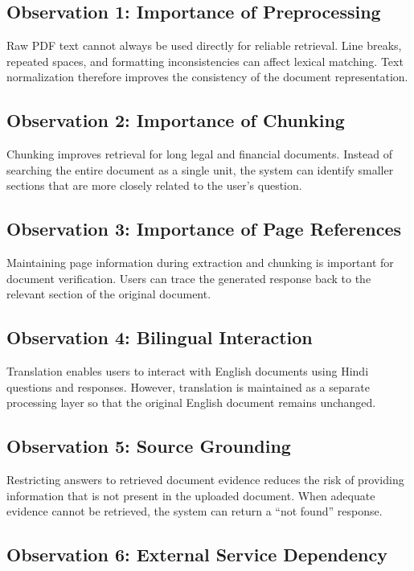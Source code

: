 \subsection{Observation 1: Importance of Preprocessing}

Raw PDF text cannot always be used directly for reliable retrieval.
Line breaks, repeated spaces, and formatting inconsistencies can
affect lexical matching. Text normalization therefore improves the
consistency of the document representation.

\subsection{Observation 2: Importance of Chunking}

Chunking improves retrieval for long legal and financial documents.
Instead of searching the entire document as a single unit, the system
can identify smaller sections that are more closely related to the
user's question.

\subsection{Observation 3: Importance of Page References}

Maintaining page information during extraction and chunking is
important for document verification. Users can trace the generated
response back to the relevant section of the original document.

\subsection{Observation 4: Bilingual Interaction}

Translation enables users to interact with English documents using
Hindi questions and responses. However, translation is maintained as
a separate processing layer so that the original English document
remains unchanged.

\subsection{Observation 5: Source Grounding}

Restricting answers to retrieved document evidence reduces the risk of
providing information that is not present in the uploaded document.
When adequate evidence cannot be retrieved, the system can return a
``not found'' response.

\subsection{Observation 6: External Service Dependency}


